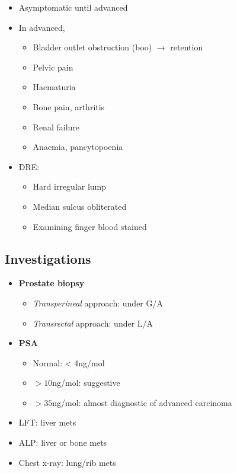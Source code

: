 \documentclass[
  12pt,
]{memoir}
\providecommand{\tightlist}{%
  \setlength{\itemsep}{0pt}\setlength{\parskip}{0pt}}
\begin{document}
\begin{itemize}
\tightlist
\item
  Asymptomatic until advanced
\item
  In advanced,

  \begin{itemize}
  \tightlist
  \item
    Bladder outlet obstruction (boo) \(\rightarrow\) retention
  \item
    Pelvic pain
  \item
    Haematuria
  \item
    Bone pain, arthritis
  \item
    Renal failure
  \item
    Anaemia, pancytopoenia
  \end{itemize}
\item
  DRE:

  \begin{itemize}
  \tightlist
  \item
    Hard irregular lump
  \item
    Median sulcus obliterated
  \item
    Examining finger blood stained
  \end{itemize}
\end{itemize}

\hypertarget{investigations-7}{%
\subsection{Investigations}\label{investigations-7}}

\begin{itemize}
\tightlist
\item
  \textbf{Prostate biopsy}

  \begin{itemize}
  \tightlist
  \item
    \emph{Transperineal} approach: under G/A
  \item
    \emph{Transrectal} approach: under L/A
  \end{itemize}
\item
  \textbf{PSA}

  \begin{itemize}
  \tightlist
  \item
    Normal: \textless{} 4ng/mol
  \item
    \(>10\)ng/mol: suggestive
  \item
    \(>35\)ng/mol: almost diagnostic of advanced carcinoma
  \end{itemize}
\item
  LFT: liver mets
\item
  ALP: liver or bone mets
\item
  Chest x-ray: lung/rib mets
\end{itemize}
\end{document}
